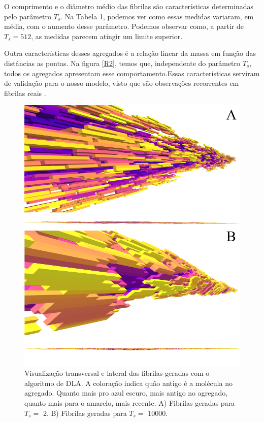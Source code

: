 \documentclass{article}
\begin{document}
O comprimento e o diâmetro médio das fibrilas são características determinadas pelo parâmetro $T_{s}$. Na Tabela 1, podemos ver como essas medidas variaram, em média, com o aumento desse parâmetro. Podemos observar como, a partir de $T_{s} = 512$, as medidas parecem atingir um limite superior. 

Outra características desses agregados é a relação linear da massa em função das distâncias as pontas. Na figura \ref{R2}, temos que, independente do parâmetro $T_{s}$, todos os agregados apresentam esse comportamento.Essas características serviram de validação para o nosso modelo, visto que são observações recorrentes em fibrilas reais \cite{}.

\begin{figure}[H]
    \centering
    \includegraphics[width=\textwidth]{figures/fibrils.png}

    \caption{Visualização transversal e lateral das fibrilas geradas com o algoritmo de DLA. A coloração indica quão antigo é a molécula no agregado. Quanto mais pro azul escuro, mais antigo no agregado, quanto mais para o amarelo, mais recente. A) Fibrilas geradas para $T_{s} = $ 2. B) Fibrilas geradas para $T_{s} = $ 10000. } 

    \label{R1}
\end{figure}
\end{document}
